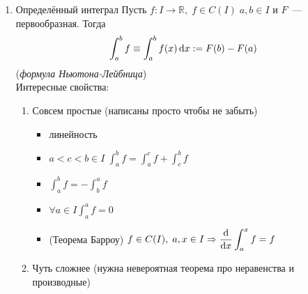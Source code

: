 \documentclass[a4paper,12pt]{article}
\newcommand\R{\mathbb{R}}
\theoremstyle{plain}
\newtheorem{thrm}{Теорема}
\theoremstyle{definition}
\theoremstyle{remark}
\newenvironment{ittproof}{$\square$ }{ $\blacksquare$ \\}
\def\resetdefs{ \setcounter{defn}{0}\setcounter{exmp}{0} }
\def\resetthrm{ \setcounter{thrm}{0}\setcounter{stat}{0} }
\def\resetrem{ \setcounter{rem}{0} }
\def\resetall{ \resetdefs \resetthrm \resetrem}
\begin{document}
\begin{enumerate}
    \begin{thrm} \label{thrm:int_ratio_nrt}
      $\int R(x, \root n \of{ax+b\over cx+d})\,
      {\rm d}x$, где $R(u,v)\in\R(u,v)$~--- выражается через элементарные функции. 
    \end{thrm}
    \begin{ittproof}
      $\sphericalangle\; t^n = {ax + b\over cx + d}\,x$.
      Тогда \[ 
        x = {dt^n - b \over a -ct^n}, \;
        \root n \of{ax+b\over cx+d} = t, \;
        {\rm d}x = {(a\,d-b\,c) \,n\,t^{n-1}\over ( c\,t^n - a )^2}{\rm d}\,t
      \]. Рационализация достигнута. 
    \end{ittproof}
  \item Определённый интеграл
    \resetall
    {  Пусть $f: I\to \R,\; f\in C(I)\; a,b\in I$ и $F$~---первообразная. Тогда
    \[
      \int_a^bf \equiv \int_a^bf(x)\,{\rm d}x := F(b) - F(a) 
    \](\emph{формула Ньютона-Лейбница}) }
    \hphantom{0} \\ Интересные свойства:
    \begin{enumerate}
      \item Совсем простые (написаны просто чтобы не забыть)
        \begin{itemize}
          \item линейность
          \item $\displaystyle a<c<b\in I\; \int_a^bf = \int_a^cf+\int_c^bf$
          \item $\displaystyle \int_a^bf = -\int_b^af$
          \item $\displaystyle \forall a\in I \int_a^af=0$
          \item (Теорема Барроу) $\displaystyle f\in C(I),\; a,x\in I \Rightarrow 
            {{\rm d}\over{\rm d}x} \int_a^xf = f$
        \end{itemize}
      \item Чуть сложнее (нужна невероятная теорема про неравенства и производные)
\end{enumerate}
\end{enumerate}
\end{document}
